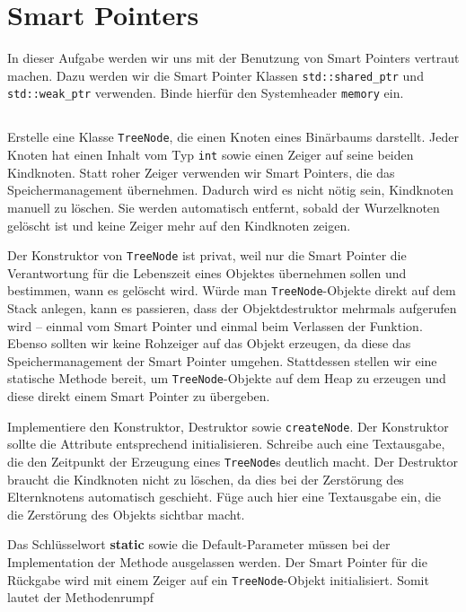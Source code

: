 \section{\ExercisePrefixMemory Smart Pointers}
In dieser Aufgabe werden wir uns mit der Benutzung von Smart Pointers vertraut machen. Dazu werden wir die Smart Pointer Klassen \lstinline{std::shared_ptr} und \lstinline{std::weak_ptr} verwenden. Binde hierfür den Systemheader \lstinline{memory} ein.


\subsection{}
Erstelle eine Klasse \lstinline{TreeNode}, die einen Knoten eines Binärbaums darstellt.
Jeder Knoten hat einen Inhalt vom Typ \lstinline{int} sowie einen Zeiger auf seine beiden Kindknoten.
Statt \glqq roher\grqq{} Zeiger verwenden wir Smart Pointers, die das Speichermanagement übernehmen.
Dadurch wird es nicht nötig sein, Kindknoten manuell zu löschen.
Sie werden automatisch entfernt, sobald der Wurzelknoten gelöscht ist und keine Zeiger mehr auf den Kindknoten zeigen.



Der Konstruktor von \lstinline{TreeNode} ist privat, weil nur die Smart Pointer die Verantwortung für die Lebenszeit eines Objektes übernehmen sollen und bestimmen, wann es gelöscht wird.
Würde man \lstinline{TreeNode}-Objekte direkt auf dem Stack anlegen, kann es passieren, dass der Objektdestruktor mehrmals aufgerufen wird -- einmal vom Smart Pointer und einmal beim Verlassen der Funktion.
Ebenso sollten wir keine Rohzeiger auf das Objekt erzeugen, da diese das Speichermanagement der Smart Pointer umgehen.
Stattdessen stellen wir eine statische Methode bereit, um \lstinline{TreeNode}-Objekte auf dem Heap zu erzeugen und diese direkt einem Smart Pointer zu übergeben.

Implementiere den Konstruktor, Destruktor sowie \lstinline{createNode}.
Der Konstruktor sollte die Attribute entsprechend initialisieren.
Schreibe auch eine Textausgabe, die den Zeitpunkt der Erzeugung eines \lstinline{TreeNode}s deutlich macht.
Der Destruktor braucht die Kindknoten nicht zu löschen, da dies bei der Zerstörung des Elternknotens automatisch geschieht.
Füge auch hier eine Textausgabe ein, die die Zerstörung des Objekts sichtbar macht.

Das Schlüsselwort \textbf{static} sowie die Default-Parameter müssen bei der Implementation der Methode ausgelassen werden.
Der Smart Pointer für die Rückgabe wird mit einem Zeiger auf ein \lstinline{TreeNode}-Objekt initialisiert. Somit lautet der Methodenrumpf

